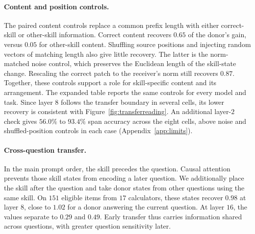 \begin{table}[t]
\centering
\caption{Main depth comparison across four open-weight models and two benchmarks.
$n/G$ gives common eligible questions/skill groups. $T$ and $R$ are the first
half-effect crossings for transfer ($\rho<0.5$) and aggregate source dependence
($d\le0.5$). $\Delta=R-T$ is in layers. $\Delta/D$ normalizes the gap
by the model's layer count. All eight cells use audited common-item populations.}
\label{tab:paireddepth}
\normalfont\rmfamily\fontsize{9}{11}\selectfont
\renewcommand{\arraystretch}{1.18}
\setlength{\tabcolsep}{3pt}

\end{table}

\paragraph{Content and position controls.}
The paired content controls replace a common prefix length with either
correct-skill or other-skill information. Correct content recovers $0.65$
of the donor's gain, versus $0.05$ for other-skill content. Shuffling source
positions and injecting random vectors of matching length also give little
recovery. The latter is the norm-matched noise control, which preserves
the Euclidean length of the skill-state change. Rescaling
the correct patch to the receiver's norm still recovers $0.87$.
Together, these controls support a role for skill-specific content and
its arrangement.
The expanded table reports the same controls for every model and task.
Since layer $8$ follows the transfer boundary in several cells, its lower
recovery is consistent with Figure~\ref{fig:transferreading}.
An additional layer-$2$ check gives $56.0\%$ to $93.4\%$ span accuracy
across the eight cells, above noise and shuffled-position controls
in each case (Appendix~\ref{app:limits}).

\paragraph{Cross-question transfer.}
\label{sec:whose}
In the main prompt order, the skill precedes the question. Causal attention
prevents those skill states from encoding a later question. We additionally
place the skill after the question and take donor states from other
questions using the same skill. On $151$ eligible items from $17$
calculators, these states recover $0.98$ at layer $8$, close to $1.02$ for
a donor answering the current question. At layer $16$, the values separate
to $0.29$ and $0.49$. Early transfer thus carries information shared across
questions, with greater question sensitivity later.

